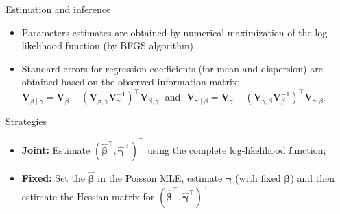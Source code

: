 \documentclass[11pt]{beamer}\usepackage[]{graphicx}\usepackage[]{color}
\begin{document}
\begin{frame}{Estimation and inference}

\begin{itemize}
  \item Parameters estimates are obtained by numerical maximization
    of the log-likelihood function (by BFGS algorithm)
  \item Standard errors for regression coefficients (for mean and
    dispersion) are obtained based on the observed information matrix:\\
    {\small $\bm{V}_{\beta \mid \gamma} = \bm{V}_{\beta} -
     (\bm{V}_{\beta, \gamma} \bm{V}_{\gamma}^{-1})^\top
     \bm{V}_{\beta, \gamma}\;$ and
    $\;\bm{V}_{\gamma \mid \beta} = \bm{V}_{\gamma} -
     (\bm{V}_{\gamma, \beta} \bm{V}_{\beta}^{-1})^\top
     \bm{V}_{\gamma, \beta}$}.
\end{itemize}
\vspace{0.5cm}

Strategies
\begin{itemize}
  \item \textbf{Joint:} Estimate
  $(\hat{\bm{\beta}}^\top, \hat{\bm{\gamma}}^\top)^\top$ using the
  complete log-likelihood function;
  \item \textbf{Fixed:} Set the $\hat{\bm{\beta}}$ in the Poisson MLE,
  estimate $\bm{\gamma}$ (with fixed $\bm{\beta}$) and then estimate
  the Hessian matrix for
  $(\hat{\bm{\beta}}^\top, \hat{\bm{\gamma}}^\top)^\top$.
\end{itemize}
\end{frame}
\end{document}

